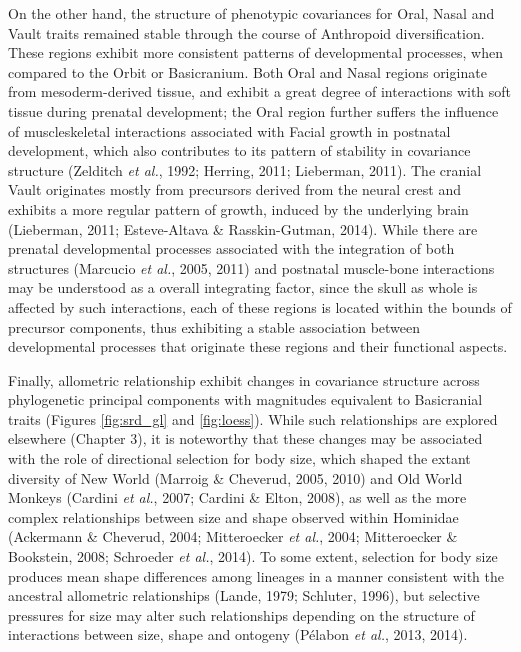 \documentclass[12pt,twoside]{report}
\begin{document}
On the other hand, the structure of phenotypic covariances for Oral,
Nasal and Vault traits remained stable through the course of Anthropoid
diversification. These regions exhibit more consistent patterns of
developmental processes, when compared to the Orbit or Basicranium. Both
Oral and Nasal regions originate from mesoderm-derived tissue, and
exhibit a great degree of interactions with soft tissue during prenatal
development; the Oral region further suffers the influence of
muscleskeletal interactions associated with Facial growth in postnatal
development, which also contributes to its pattern of stability in
covariance structure (Zelditch \emph{et al.}, 1992; Herring, 2011;
Lieberman, 2011). The cranial Vault originates mostly from precursors
derived from the neural crest and exhibits a more regular pattern of
growth, induced by the underlying brain (Lieberman, 2011; Esteve-Altava
\& Rasskin-Gutman, 2014). While there are prenatal developmental
processes associated with the integration of both structures (Marcucio
\emph{et al.}, 2005, 2011) and postnatal muscle-bone interactions may be
understood as a overall integrating factor, since the skull as whole is
affected by such interactions, each of these regions is located within
the bounds of precursor components, thus exhibiting a stable association
between developmental processes that originate these regions and their
functional aspects.

Finally, allometric relationship exhibit changes in covariance structure
across phylogenetic principal components with magnitudes equivalent to
Basicranial traits (Figures \ref{fig:srd_gl} and \ref{fig:loess}). While
such relationships are explored elsewhere (Chapter 3), it is noteworthy
that these changes may be associated with the role of directional
selection for body size, which shaped the extant diversity of New World
(Marroig \& Cheverud, 2005, 2010) and Old World Monkeys (Cardini
\emph{et al.}, 2007; Cardini \& Elton, 2008), as well as the more
complex relationships between size and shape observed within Hominidae
(Ackermann \& Cheverud, 2004; Mitteroecker \emph{et al.}, 2004;
Mitteroecker \& Bookstein, 2008; Schroeder \emph{et al.}, 2014). To some
extent, selection for body size produces mean shape differences among
lineages in a manner consistent with the ancestral allometric
relationships (Lande, 1979; Schluter, 1996), but selective pressures for
size may alter such relationships depending on the structure of
interactions between size, shape and ontogeny (Pélabon \emph{et al.},
2013, 2014).
\end{document}
